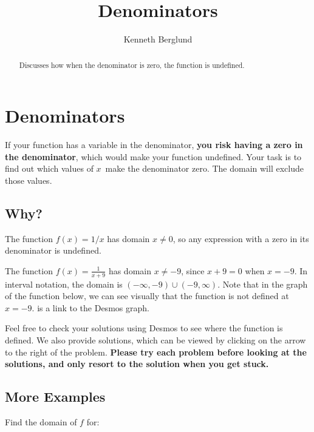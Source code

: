 \documentclass{ximera}
\title{Denominators}
\author{Kenneth Berglund}
\begin{document}
\begin{abstract}
Discusses how when the denominator is zero, the function is undefined. 
\end{abstract}
\maketitle

\section{Denominators}
If your function has a variable in the denominator, \textbf{you risk having a zero in the denominator}, which would make your function undefined. Your task is to find out which values of $x$ make the denominator zero. The domain will exclude those values.

\subsection{Why?}
The function $f(x) = 1/x$ has domain $x \ne 0$, so any expression with a zero in its denominator is undefined. 

\begin{example}
The function $f(x) = \frac{1}{x + 9}$ has domain $x \ne -9$, since $x + 9 = 0$ when $x = -9$. In interval notation, the domain is $(-\infty, -9) \cup (-9, \infty)$. Note that in the graph of the function below, we can see visually that the function is not defined at $x = -9$.  is a link to the Desmos graph. 

\begin{center}
\end{center}
\end{example}

Feel free to check your solutions using Desmos to see where the function is defined. We also provide solutions, which can be viewed by clicking on the arrow to the right of the problem. \textbf{Please try each problem before looking at the solutions, and only resort to the solution when you get stuck.} 

\subsection{More Examples}
Find the domain of $f$ for:
\end{document}
